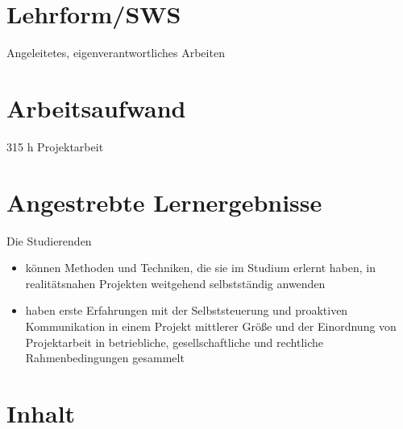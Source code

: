 \hypertarget{lehrformswspathlabelmi-2017modulbeschreibungen-bachelorba_praxisprojektarbeit}{%
\section*{Lehrform/SWS\label{/mi-2017/modulbeschreibungen-bachelor/BA_Praxisprojektarbeit}}\label{lehrformswspathlabelmi-2017modulbeschreibungen-bachelorba_praxisprojektarbeit}}

Angeleitetes, eigenverantwortliches Arbeiten

\hypertarget{arbeitsaufwandpathlabelmi-2017modulbeschreibungen-bachelorba_praxisprojektarbeit}{%
\section*{Arbeitsaufwand\label{/mi-2017/modulbeschreibungen-bachelor/BA_Praxisprojektarbeit}}\label{arbeitsaufwandpathlabelmi-2017modulbeschreibungen-bachelorba_praxisprojektarbeit}}

315 h Projektarbeit

\hypertarget{angestrebte-lernergebnissepathlabelmi-2017modulbeschreibungen-bachelorba_praxisprojektarbeit}{%
\section*{Angestrebte
Lernergebnisse\label{/mi-2017/modulbeschreibungen-bachelor/BA_Praxisprojektarbeit}}\label{angestrebte-lernergebnissepathlabelmi-2017modulbeschreibungen-bachelorba_praxisprojektarbeit}}

Die Studierenden

\begin{itemize}
\tightlist
\item
  können Methoden und Techniken, die sie im Studium erlernt haben, in
  realitätsnahen Projekten weitgehend selbstständig anwenden
\item
  haben erste Erfahrungen mit der Selbststeuerung und proaktiven
  Kommunikation in einem Projekt mittlerer Größe und der Einordnung von
  Projektarbeit in betriebliche, gesellschaftliche und rechtliche
  Rahmenbedingungen gesammelt
\end{itemize}

\hypertarget{inhaltpathlabelmi-2017modulbeschreibungen-bachelorba_praxisprojektarbeit}{%
\section*{Inhalt\label{/mi-2017/modulbeschreibungen-bachelor/BA_Praxisprojektarbeit}}\label{inhaltpathlabelmi-2017modulbeschreibungen-bachelorba_praxisprojektarbeit}}

